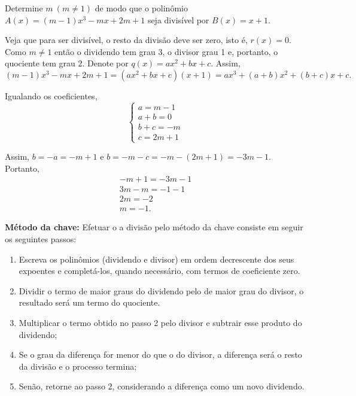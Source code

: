 \begin{exem}
    Determine $m \ (m\neq 1)$ de modo que o polinômio $A(x)=(m-1)x^3-mx+2m+1$ seja divisível por $B(x)=x+1$.

    Veja que para ser divisível, o resto da divisão deve ser zero, isto é, $r(x)=0$. Como $m\neq 1$ então o dividendo tem grau 3, o divisor grau 1 e, portanto, o quociente tem grau 2. Denote por $q(x)=ax^2+bx+c$. Assim,
    \begin{equation*}
        (m-1)x^3-mx+2m+1 = (ax^2+bx+c)(x+1) = ax^3+(a+b)x^2+(b+c)x+c.
    \end{equation*}

    Igualando os coeficientes,
    \begin{equation*}
        \left\{
        \begin{matrix}
            a=m-1\\
            a+b=0\\
            b+c=-m\\
            c=2m+1
        \end{matrix}
        \right.
    \end{equation*}

    Assim, $b=-a=-m+1$ e $b=-m-c=-m-(2m+1)=-3m-1$. Portanto,
    \begin{gather*}
        -m+1=-3m-1\\
        3m-m=-1-1\\
        2m=-2\\
        m=-1.
    \end{gather*}
\end{exem}

\textbf{Método da chave:} Efetuar o a divisão pelo método da chave consiste em seguir os seguintes passos:
\begin{enumerate}
    \item Escreva os polinômios (dividendo e divisor) em ordem decrescente dos seus expoentes e completá-los, quando necessário, com termos de coeficiente zero.
    \item Dividir o termo de maior graus do dividendo pelo de maior grau do divisor, o resultado será um termo do quociente.
    \item Multiplicar o termo obtido no passo 2 pelo divisor e subtrair esse produto do dividendo;
    \item Se o grau da diferença for menor do que o do divisor, a diferença será o resto da divisão e o processo termina;
    \item Senão, retorne ao passo 2, considerando a diferença como um novo dividendo.
\end{enumerate}

